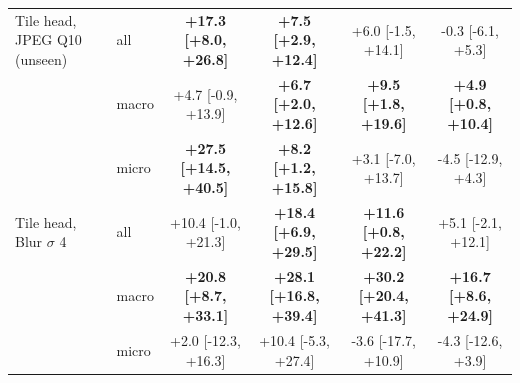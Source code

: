 \begin{tabular}{@{}llcccc@{}}
\addlinespace
Tile head, JPEG Q10 (unseen) & all & \textbf{+17.3 {\scriptsize[+8.0, +26.8]}} & \textbf{+7.5 {\scriptsize[+2.9, +12.4]}} & +6.0 {\scriptsize[-1.5, +14.1]} & -0.3 {\scriptsize[-6.1, +5.3]}\\
 & macro & +4.7 {\scriptsize[-0.9, +13.9]} & \textbf{+6.7 {\scriptsize[+2.0, +12.6]}} & \textbf{+9.5 {\scriptsize[+1.8, +19.6]}} & \textbf{+4.9 {\scriptsize[+0.8, +10.4]}}\\
 & micro & \textbf{+27.5 {\scriptsize[+14.5, +40.5]}} & \textbf{+8.2 {\scriptsize[+1.2, +15.8]}} & +3.1 {\scriptsize[-7.0, +13.7]} & -4.5 {\scriptsize[-12.9, +4.3]}\\
\addlinespace
Tile head, Blur $\sigma$ 4 & all & +10.4 {\scriptsize[-1.0, +21.3]} & \textbf{+18.4 {\scriptsize[+6.9, +29.5]}} & \textbf{+11.6 {\scriptsize[+0.8, +22.2]}} & +5.1 {\scriptsize[-2.1, +12.1]}\\
 & macro & \textbf{+20.8 {\scriptsize[+8.7, +33.1]}} & \textbf{+28.1 {\scriptsize[+16.8, +39.4]}} & \textbf{+30.2 {\scriptsize[+20.4, +41.3]}} & \textbf{+16.7 {\scriptsize[+8.6, +24.9]}}\\
 & micro & +2.0 {\scriptsize[-12.3, +16.3]} & +10.4 {\scriptsize[-5.3, +27.4]} & -3.6 {\scriptsize[-17.7, +10.9]} & -4.3 {\scriptsize[-12.6, +3.9]}\\
\bottomrule
\end{tabular}
